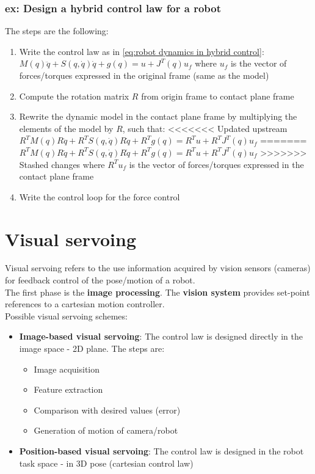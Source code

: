 \documentclass[a4paper,12pt]{article}
\begin{document}
\subsubsection{ex: Design a hybrid control law for a robot}
The steps are the following:
\begin{enumerate}
    \item Write the control law as in \ref{eq:robot dynamics in hybrid control}:
    $M(q)\ddot{q}+S(q,\dot{q})\dot{q}+g(q)=u+J^T(q)u_f$
    where $u_f$ is the vector of forces/torques expressed 
    in the original frame (same as the model)
    \item Compute the rotation matrix $R$ from origin frame to contact plane frame 
    \item Rewrite the dynamic model in the contact plane frame
    by multiplying the elements of the model by $R$, such that:
<<<<<<< Updated upstream
    $R^TM(q)R\ddot{q}+R^TS(q,\dot{q}) R\dot{q}+R^Tg(q)=R^Tu + R^TJ^T(q)u_f$
=======
    $R^TM(q)R\ddot{q}+R^TS(q,\dot{q})R\dot{q}+R^Tg(q)=R^Tu + R^TJ^T(q)u_f$
>>>>>>> Stashed changes
    where $R^T u_f$ is the vector of forces/torques expressed in the contact plane frame
    \item Write the control loop for the force control
\end{enumerate}





\section{Visual servoing}
Visual servoing refers to the
use information acquired by vision sensors (cameras)
for feedback control of the pose/motion of a robot.\\
The first phase is the \textbf{image processing}.
The \textbf{vision system} provides set-point references to a cartesian 
motion controller.\\
Possible visual servoing schemes:
\begin{itemize}
    \item \textbf{Image-based visual servoing}: The control law
     is designed directly in the image space - 2D plane.
      The steps are: \begin{itemize}
        \item Image acquisition 
        \item Feature extraction
        \item Comparison with desired values (error)
        \item Generation of motion of camera/robot
      \end{itemize}
    \item \textbf{Position-based visual servoing}: The control 
    law is designed
    in the robot task space - in 3D pose (cartesian control law)
\end{itemize}
\end{document}
